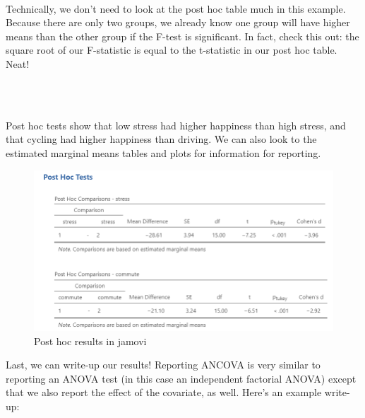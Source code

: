 \documentclass[
]{book}
\newenvironment{info}
    {
    \hline\\
    }
    { 
    \\\\\hline
    }
\begin{document}
\begin{info}
Technically, we don't need to look at the post hoc table much in this
example. Because there are only two groups, we already know one group
will have higher means than the other group if the F-test is
significant. In fact, check this out: the square root of our F-statistic
is equal to the t-statistic in our post hoc table. Neat!
\end{info}

Post hoc tests show that low stress had higher happiness than high stress, and that cycling had higher happiness than driving. We can also look to the estimated marginal means tables and plots for information for reporting.

\begin{figure}

{\centering \includegraphics[width=1\linewidth]{images/07-ancova/ancova_tukey} 

}

\caption{Post hoc results in jamovi}\label{fig:unnamed-chunk-6}
\end{figure}

Last, we can write-up our results! Reporting ANCOVA is very similar to reporting an ANOVA test (in this case an independent factorial ANOVA) except that we also report the effect of the covariate, as well. Here's an example write-up:
\end{document}
